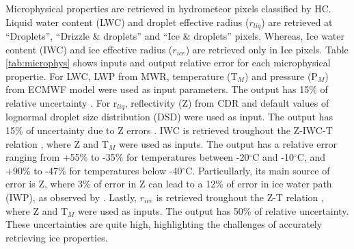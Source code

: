 Microphysical properties are retrieved in hydrometeor pixels classified by HC. Liquid water content (LWC) and droplet effective radius ($r_{liq}$) are retrieved at “Droplets”, “Drizzle \& droplets” and “Ice \& droplets” pixels. Whereas, Ice water content (IWC) and ice effective radius ($r_{ice}$) are retrieved only in Ice pixels. Table \ref{tab:microphys} shows inputs and output relative error for each microphysical propertie. For LWC, LWP from MWR, temperature (T$_{M}$) and pressure (P$_{M}$) from ECMWF model were used as input parameters. The output has 15\% of relative uncertainty \citep{frischCloudRadarMicrowave1998}.
For r$_{liq}$, reflectivity (Z) from CDR and default values of lognormal droplet size distribution (DSD) were used as input. The output has 15\% of uncertainty due to Z errors \citep{frischRetrievalStratusCloud2002}. 
IWC is retrieved troughout the Z-IWC-T relation \citep{hoganRetrievalIceWater2006}, where Z and T$_{M}$ were used as inputs. The output has a relative error ranging from +55\% to -35\% for temperatures between -20$^{\circ}$C and -10$^{\circ}$C, and +90\% to -47\% for temperatures below -40$^{\circ}$C. Particullarly, its main source of error is Z, where 3\% of error in Z can lead to a 12\% of error in ice water path (IWP), as observed by  \citet{saavedragarfiasAsymmetriesCloudMicrophysical2023}. 
Lastly,  $r_{ice}$ is retrieved troughout the Z-T relation \citep{griescheApplicationShipborneRemote2019}, where Z and T$_{M}$ were used as inputs. The output has 50\% of relative uncertainty. These uncertainties are quite high, highlighting the challenges of accurately retrieving ice properties.

